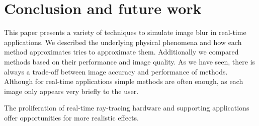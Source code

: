 \chapter{Conclusion and future work}
This paper presents a variety of techniques to simulate image blur in real-time applications.
We described the underlying physical phenomena and how each method approximates tries to approximate them.
Additionally we compared methods based on their performance and image quality.
As we have seen, there is always a trade-off between image accuracy and performance of methods.
Although for real-time applications simple methods are often enough, as each image only appears very briefly to the user.

The proliferation of real-time ray-tracing hardware and supporting applications offer opportunities for more realistic effects.
